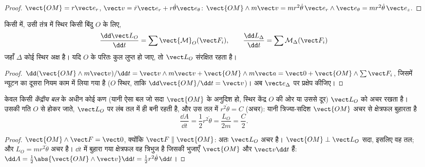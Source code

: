 \begin{proof}
$\vect{OM} = r\vect e_r$, $\vect v = \dot r\vect e_r + r\dot\theta\vect e_\theta$:
$\vect{OM}\wedge m\vect v = mr^2\dot\theta\,\vect e_r\wedge\vect e_\theta = mr^2\dot\theta\,\vect e_z$.
\end{proof}

\begin{theorem}[कोणीय संवेग प्रमेय]\label{thm:b1:angular-momentum:theorem}
किसी  में, उसी तंत्र में स्थिर किसी बिंदु $O$ के लिए,
\[
\frac{\dd\vect L_O}{\dd t} = \sum\vect{\mathcal M}_O(\vect F_i),
\qquad
\frac{\dd L_\Delta}{\dd t} = \sum\mathcal M_\Delta(\vect F_i)
\]
जहाँ $\Delta$ कोई स्थिर अक्ष है। यदि $O$ के परितः कुल  लुप्त हो जाए,
तो $\vect L_O$ संरक्षित रहता है।
\end{theorem}

\begin{proof}
$\dd(\vect{OM}\wedge m\vect v)/\dd t = \vect v\wedge m\vect v + \vect{OM}\wedge m\vect a
= \vect 0 + \vect{OM}\wedge\sum\vect F_i$, जिसमें न्यूटन का दूसरा नियम काम
में लिया गया है ($O$ स्थिर, ताकि $\dd\vect{OM}/\dd t = \vect v$)। अब $\vect e_\Delta$ पर प्रक्षेप कीजिए।
\end{proof}

\begin{corollary}[केंद्रीय बल: तलीय गति और क्षेत्रफल का नियम]\label{cor:b1:angular-momentum:central}
केवल किसी \emph{केंद्रीय बल} के अधीन कोई कण (यानी ऐसा बल जो सदा
$\vect{OM}$ के अनुदिश हो, स्थिर केंद्र $O$ की ओर या उससे दूर)
$\vect L_O$ को अचर रखता है। उसकी गति $O$ से होकर जाते, $\vect L_O$ पर लंब
तल में ही बनी रहती है, और उस तल में $r^2\dot\theta = C$ (अचर): यानी
त्रिज्या-सदिश $\vect{OM}$ अचर \emph{} से क्षेत्रफल
बुहारता है
\[
\frac{\dd A}{\dd t} = \frac12 r^2\dot\theta = \frac{L_O}{2m} = \frac{C}{2} .
\]
\end{corollary}

\begin{proof}
$\vect{OM}\wedge\vect F = \vect 0$, क्योंकि $\vect F \parallel \vect{OM}$: अतः $\vect L_O$
अचर है। $\vect{OM}\perp\vect L_O$ सदा, इसलिए वह तल; और $L_O =
mr^2\dot\theta$ अचर है। $\dd t$ में बुहारा गया क्षेत्रफल वह त्रिभुज है
जिसकी भुजाएँ $\vect{OM}$ और $\vect v\dd t$ हैं: $\dd A = \tfrac12\abs{\vect{OM}
\wedge\vect v}\dd t = \tfrac12 r^2\dot\theta\,\dd t$।
\end{proof}

